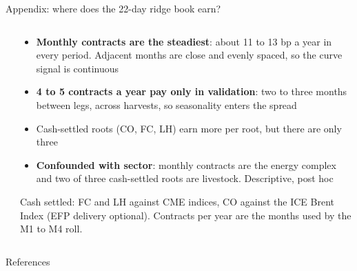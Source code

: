 \documentclass[10pt, aspectratio=169]{beamer}
\newcommand{\key}[1]{\textcolor{accent}{\textbf{#1}}}
\begin{document}
\begin{frame}{Appendix: where does the 22-day ridge book earn?}
\begin{columns}[c, onlytextwidth]
\begin{column}{0.47\textwidth}
\begin{table}
\centering
\scriptsize
\renewcommand{\arraystretch}{0.92}
\setlength{\tabcolsep}{4pt}

\caption{Net-of-all-cost contribution in bp of capital per year, Sharpe in
parentheses, ridge every 22 days, \$1m, equal $1/N$.}
\end{table}
\end{column}
\begin{column}{0.50\textwidth}
\footnotesize
\begin{itemize}
  \item \key{Monthly contracts are the steadiest}: about 11 to 13 bp a year in
        every period. Adjacent months are close and evenly spaced, so the curve
        signal is continuous
  \item \key{4 to 5 contracts a year pay only in validation}: two to three
        months between legs, across harvests, so seasonality enters the spread
  \item Cash-settled roots (CO, FC, LH) earn more per root, but there are
        only three
  \item \key{Confounded with sector}: monthly contracts are the energy complex
        and two of three cash-settled roots are livestock. Descriptive, post hoc
\end{itemize}
{\scriptsize\color{slate}Cash settled: FC and LH against CME indices, CO
against the ICE Brent Index (EFP delivery optional). Contracts per year are the
months used by the M1 to M4 roll.}
\end{column}
\end{columns}
\end{frame}

\begin{frame}[allowframebreaks]{References}
\printbibliography[heading=none]
\end{frame}
\end{document}
